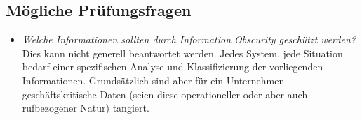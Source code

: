 \subsection*{Mögliche Prüfungsfragen}
\begin{itemize}
	\item \emph{Welche Informationen sollten durch Information Obscurity geschützt werden?}\\
	Dies kann nicht generell beantwortet werden. Jedes System, jede Situation bedarf einer spezifischen Analyse und Klassifizierung der vorliegenden Informationen. Grundsätzlich sind aber für ein Unternehmen geschäftskritische Daten (seien diese operationeller oder aber auch rufbezogener Natur) tangiert.
\end{itemize}

